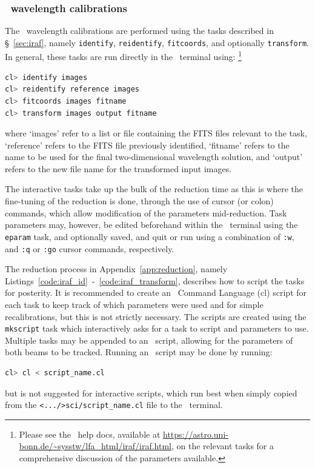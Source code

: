 \subsubsection{\iraf\ wavelength calibrations}

The \iraf\ wavelength calibrations are performed using the tasks described in \S~\ref{sec:iraf}, namely \texttt{identify}, \texttt{reidentify}, \texttt{fitcoords}, and optionally \texttt{transform}. In general, these tasks are run directly in the \iraf\ terminal using:%
\footnote{Please see the \iraf\ help docs, available at \url{https://astro.uni-bonn.de/~sysstw/lfa_html/iraf/iraf.html}, on the relevant tasks for a comprehensive discussion of the parameters available.}
\begin{lstlisting}[language=bash]
cl> identify images
cl> reidentify reference images
cl> fitcoords images fitname
cl> transform images output fitname
\end{lstlisting}
{\parskip=0pt where} `images' refer to a list or file containing the \gls{FITS} files relevant to the task, `reference' refers to the \gls{FITS} file previously identified, `fitname' refers to the name to be used for the final two-dimensional wavelength solution, and `output' refers to the new file name for the transformed input images.

The interactive tasks take up the bulk of the reduction time as this is where the fine-tuning of the reduction is done, through the use of cursor (or colon) commands, which allow modification of the parameters mid-reduction. Task parameters may, however, be edited beforehand within the \iraf\ terminal using the \texttt{eparam} task, and optionally saved, and quit or run using a combination of \texttt{:w}, and \texttt{:q} or \texttt{:go} cursor commands, respectively.

The reduction process in Appendix~\ref{app:reduction}, namely Listings~\ref{code:iraf_id}~-~\ref{code:iraf_transform}, describes how to script the tasks for posterity. It is recommended to create an \iraf\ Command Language (cl) script for each task to keep track of which parameters were used and for simple recalibrations, but this is not strictly necessary. The scripts are created using the \texttt{mkscript} task which interactively asks for a task to script and parameters to use. Multiple tasks may be appended to an \iraf\ script, allowing for the parameters of both beams to be tracked. Running an \iraf\ script may be done by running:
\begin{lstlisting}[language=bash]
cl> cl < script_name.cl
\end{lstlisting}
{\parskip=0pt but} is not suggested for interactive scripts, which run best when simply copied from the \texttt{<.../>sci/script\_name.cl} file to the \iraf\ terminal.

